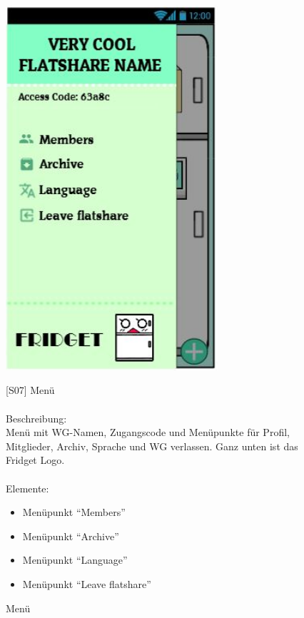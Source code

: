 \documentclass[a4paper]{scrreprt}
\begin{document}
    	\begin{figure}[h]
    		\begin{minipage}[b]{0.4\linewidth}
    			\flushright
    			\centering
    			\includegraphics[width=0.7\textwidth]{fridget_menu.JPG}
    			\caption{Menü}
    			\label{fig:figure1}
    			\vspace{20mm}
    		\end{minipage}
    		\hspace{0.5cm}
    		\begin{minipage}[b]{0.55\linewidth}
    			\flushleft
    			{[}S07{]} Menü \\
    			\hfill
    			\\Beschreibung: \\
    			Menü mit WG-Namen, Zugangscode und
    			Menüpunkte für Profil, Mitglieder, Archiv,
    			Sprache und WG verlassen. Ganz unten ist das
    			Fridget Logo.\\
    			
    			\hfill 
    			\\Elemente:
    			\begin{itemize}
    				\renewcommand\labelitemi{--}
    				\item Menüpunkt ``Members”
    				\item Menüpunkt ``Archive”
    				\item Menüpunkt ``Language”
    				\item Menüpunkt ``Leave flatshare”
    				

\end{itemize}
\end{minipage}
\end{figure}
\end{document}

